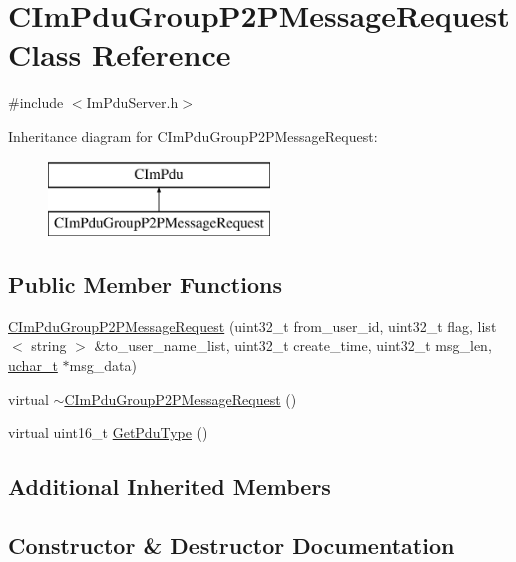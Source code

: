 \hypertarget{class_c_im_pdu_group_p2_p_message_request}{}\section{C\+Im\+Pdu\+Group\+P2\+P\+Message\+Request Class Reference}
\label{class_c_im_pdu_group_p2_p_message_request}


{\ttfamily \#include $<$Im\+Pdu\+Server.\+h$>$}

Inheritance diagram for C\+Im\+Pdu\+Group\+P2\+P\+Message\+Request\+:\begin{figure}[H]
\begin{center}
\leavevmode
\includegraphics[height=2.000000cm]{class_c_im_pdu_group_p2_p_message_request}
\end{center}
\end{figure}
\subsection*{Public Member Functions}
\begin{DoxyCompactItemize}
\item 
\hyperlink{class_c_im_pdu_group_p2_p_message_request_a53c71c891cf7f3630acba126b22d5874}{C\+Im\+Pdu\+Group\+P2\+P\+Message\+Request} (uint32\+\_\+t from\+\_\+user\+\_\+id, uint32\+\_\+t flag, list$<$ string $>$ \&to\+\_\+user\+\_\+name\+\_\+list, uint32\+\_\+t create\+\_\+time, uint32\+\_\+t msg\+\_\+len, \hyperlink{base_2ostype_8h_a124ea0f8f4a23a0a286b5582137f0b8d}{uchar\+\_\+t} $\ast$msg\+\_\+data)
\item 
virtual \hyperlink{class_c_im_pdu_group_p2_p_message_request_a2d7ca3105600f262f8466c6f8b48f149}{$\sim$\+C\+Im\+Pdu\+Group\+P2\+P\+Message\+Request} ()
\item 
virtual uint16\+\_\+t \hyperlink{class_c_im_pdu_group_p2_p_message_request_aded030a11283b4c35c2177591796a408}{Get\+Pdu\+Type} ()
\end{DoxyCompactItemize}
\subsection*{Additional Inherited Members}


\subsection{Constructor \& Destructor Documentation}
\hypertarget{class_c_im_pdu_group_p2_p_message_request_a53c71c891cf7f3630acba126b22d5874}{}
